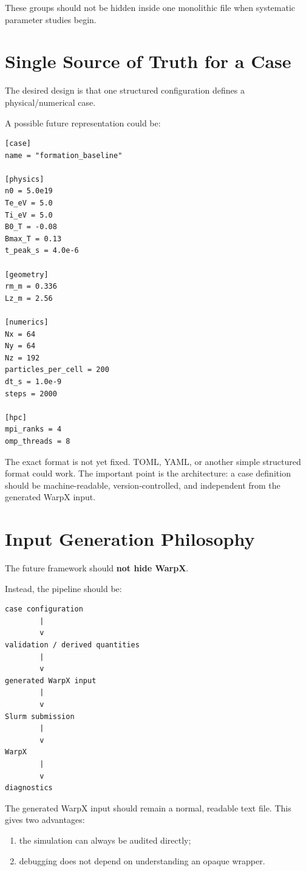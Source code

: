 \documentclass[11pt,a4paper]{article}
\begin{document}
These groups should not be hidden inside one monolithic file when systematic parameter studies begin.

\section{Single Source of Truth for a Case}

The desired design is that one structured configuration defines a physical/numerical case.

A possible future representation could be:

\begin{lstlisting}
[case]
name = "formation_baseline"

[physics]
n0 = 5.0e19
Te_eV = 5.0
Ti_eV = 5.0
B0_T = -0.08
Bmax_T = 0.13
t_peak_s = 4.0e-6

[geometry]
rm_m = 0.336
Lz_m = 2.56

[numerics]
Nx = 64
Ny = 64
Nz = 192
particles_per_cell = 200
dt_s = 1.0e-9
steps = 2000

[hpc]
mpi_ranks = 4
omp_threads = 8
\end{lstlisting}

The exact format is not yet fixed. TOML, YAML, or another simple structured format could work. The important point is the architecture: a case definition should be machine-readable, version-controlled, and independent from the generated WarpX input.

\section{Input Generation Philosophy}

The future framework should \textbf{not hide WarpX}.

Instead, the pipeline should be:

\begin{lstlisting}
case configuration
        |
        v
validation / derived quantities
        |
        v
generated WarpX input
        |
        v
Slurm submission
        |
        v
WarpX
        |
        v
diagnostics
\end{lstlisting}

The generated WarpX input should remain a normal, readable text file. This gives two advantages:

\begin{enumerate}[label=\arabic*.]
    \item the simulation can always be audited directly;
    \item debugging does not depend on understanding an opaque wrapper.
\end{enumerate}
\end{document}
